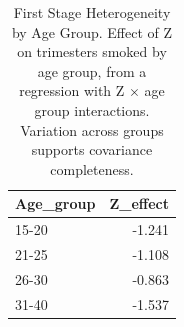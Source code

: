 \begin{table}[h!]
\centering
\caption{First Stage Heterogeneity by Age Group. Effect of Z on trimesters smoked by age group, from a regression with Z $\times$ age group interactions. Variation across groups supports covariance completeness.} 
\label{tab:fs_het}
\begingroup\small
\begin{tabular}{lr}
  \toprule
Age_group & Z_effect \\ 
  \midrule
15-20 & -1.241 \\ 
  21-25 & -1.108 \\ 
  26-30 & -0.863 \\ 
  31-40 & -1.537 \\ 
   \bottomrule
\end{tabular}
\endgroup
\end{table}
